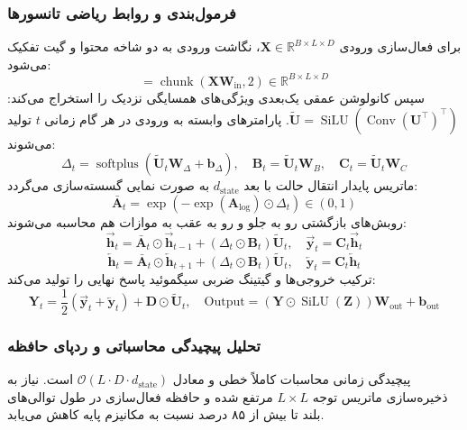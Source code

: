 \subsubsection*{فرمول‌بندی و روابط ریاضی تانسورها}
برای فعال‌سازی ورودی $\mathbf{X} \in \mathbb{R}^{B \times L \times D}$، نگاشت ورودی به دو شاخه محتوا و گیت تفکیک می‌شود:
\begin{equation}
[\mathbf{U}, \mathbf{Z}] = \operatorname{chunk}(\mathbf{X} \mathbf{W}_{\text{in}}, 2) \in \mathbb{R}^{B \times L \times D}
\end{equation}
سپس کانولوشن عمقی یک‌بعدی ویژگی‌های همسایگی نزدیک را استخراج می‌کند: $\widetilde{\mathbf{U}} = \operatorname{SiLU}(\operatorname{Conv}(\mathbf{U}^\top)^\top)$. پارامترهای وابسته به ورودی در هر گام زمانی $t$ تولید می‌شوند:
\begin{equation}
\Delta_t = \operatorname{softplus}(\widetilde{\mathbf{U}}_t \mathbf{W}_\Delta + \mathbf{b}_\Delta), \quad \mathbf{B}_t = \widetilde{\mathbf{U}}_t \mathbf{W}_B, \quad \mathbf{C}_t = \widetilde{\mathbf{U}}_t \mathbf{W}_C
\end{equation}
ماتریس پایدار انتقال حالت با بعد $d_{\text{state}}$ به صورت نمایی گسسته‌سازی می‌گردد:
\begin{equation}
\bar{\mathbf{A}}_t = \exp(-\exp(\mathbf{A}_{\text{log}}) \odot \Delta_t) \in (0, 1)
\end{equation}
روبش‌های بازگشتی رو به جلو و رو به عقب به موازات هم محاسبه می‌شوند:
\begin{equation}
\vec{\mathbf{h}}_t = \bar{\mathbf{A}}_t \odot \vec{\mathbf{h}}_{t-1} + (\Delta_t \odot \mathbf{B}_t) \widetilde{\mathbf{U}}_t, \quad \vec{\mathbf{y}}_t = \mathbf{C}_t \vec{\mathbf{h}}_t
\end{equation}
\begin{equation}
\overleftarrow{\mathbf{h}}_t = \bar{\mathbf{A}}_t \odot \overleftarrow{\mathbf{h}}_{t+1} + (\Delta_t \odot \mathbf{B}_t) \widetilde{\mathbf{U}}_t, \quad \overleftarrow{\mathbf{y}}_t = \mathbf{C}_t \overleftarrow{\mathbf{h}}_t
\end{equation}
ترکیب خروجی‌ها و گیتینگ ضربی سیگموئید پاسخ نهایی را تولید می‌کند:
\begin{equation}
\mathbf{Y}_t = \frac{1}{2}(\vec{\mathbf{y}}_t + \overleftarrow{\mathbf{y}}_t) + \mathbf{D} \odot \widetilde{\mathbf{U}}_t, \quad \text{Output} = (\mathbf{Y} \odot \operatorname{SiLU}(\mathbf{Z})) \mathbf{W}_{\text{out}} + \mathbf{b}_{\text{out}}
\end{equation}

\subsubsection*{تحلیل پیچیدگی محاسباتی و ردپای حافظه}
پیچیدگی زمانی محاسبات کاملاً خطی و معادل $\mathcal{O}(L \cdot D \cdot d_{\text{state}})$ است. نیاز به ذخیره‌سازی ماتریس توجه $L \times L$ مرتفع شده و حافظه فعال‌سازی در طول توالی‌های بلند تا بیش از ۸۵ درصد نسبت به مکانیزم پایه کاهش می‌یابد.


